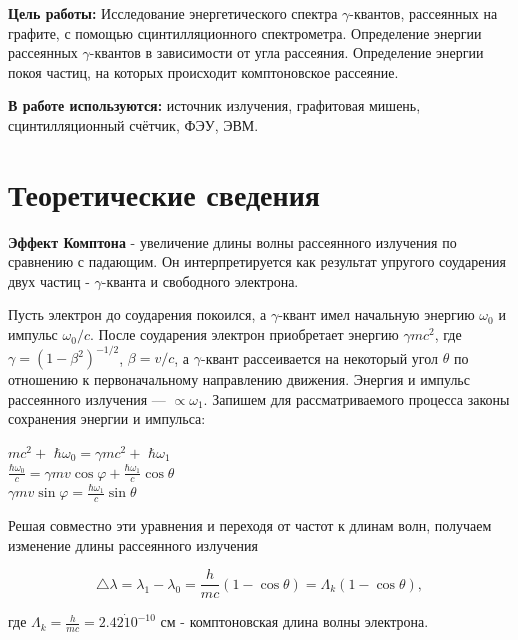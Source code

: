 \documentclass[a4paper,12pt]{article} %
\begin{document}
\noindent
\textbf{Цель работы:} Исследование энергетического спектра $\gamma$-квантов, рассеянных на графите, с помощью сцинтилляционного спектрометра. Определение энергии рассеянных $\gamma$-квантов в зависимости от угла рассеяния. Определение энергии покоя частиц, на которых происходит комптоновское рассеяние.
\medskip

\noindent \textbf{В работе используются:} источник излучения, графитовая мишень, сцинтилляционный счётчик, ФЭУ, ЭВМ.

\medskip

\section{Теоретические сведения}
\noindent \textbf{Эффект Комптона} - увеличение длины волны рассеянного излучения по сравнению с падающим. Он интерпретируется как результат упругого соударения двух частиц - $\gamma$-кванта и свободного электрона.

 \medskip

\noindent Пусть электрон до соударения покоился, а  $\gamma$-квант имел начальную энергию \hbar$\omega_0$ и импульс \hbar$\omega_0/c$. После соударения электрон приобретает энергию $\gamma mc^2$, где $\gamma = (1 − \beta^2)^{−1/2}$, $\beta = v/c$, а  $\gamma$-квант рассеивается на некоторый угол $\theta$ по отношению
к первоначальному направлению движения. Энергия и импульс рассеянного излучения — $\propto \omega_1$. Запишем для рассматриваемого процесса законы сохранения энергии и импульса:

\begin{center}
    $mc^2 +$ $\hbar \omega_0 = \gamma mc^2 +$ $\hbar \omega_1$\\
    $\frac{\hbar \omega_0}{c} = \gamma mv \cos \varphi + \frac{\hbar \omega_1}{c} \cos \theta$ \\
    $\gamma mv \sin \varphi = \frac{\hbar \omega_1}{c} \sin \theta$
\end{center}

\noindent Решая совместно эти уравнения и переходя от частот к длинам волн, получаем изменение длины рассеянного излучения

\begin{equation}
    \triangle \lambda = \lambda_1 - \lambda_0 = \frac{h}{mc}(1 - \cos \theta) = \Lambda_k(1 - \cos \theta),
\end{equation}

\noindent где $\Lambda_k = \frac{h}{mc} = 2.42 \dot 10^{-10}$ см - комптоновская длина волны электрона.
\end{document}
